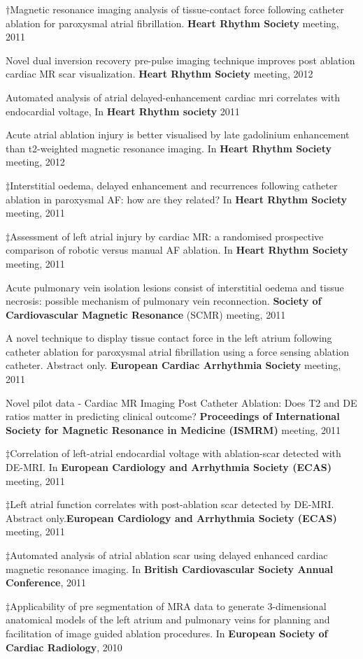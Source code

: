 \begin{etaremune}
\item $\dagger$Magnetic resonance imaging analysis of tissue-contact force following catheter ablation for paroxysmal atrial fibrillation. \textbf{Heart Rhythm Society} meeting, 2011 
\item Novel dual inversion recovery pre-pulse imaging technique improves post ablation cardiac MR scar visualization. \textbf{Heart Rhythm Society} meeting, 2012
\item Automated analysis of atrial delayed-enhancement cardiac mri correlates with endocardial voltage, In \textbf{Heart Rhythm society} 2011 
\item Acute atrial ablation injury is better visualised by late gadolinium enhancement than t2-weighted magnetic resonance imaging. In \textbf{Heart Rhythm Society} meeting, 2012
\item $\ddagger$Interstitial oedema, delayed enhancement and recurrences following catheter ablation in paroxysmal AF: how are they related? In \textbf{Heart Rhythm Society} meeting, 2011
\item $\ddagger$Assessment of left atrial injury by cardiac MR: a randomised prospective comparison of robotic versus manual AF ablation. In \textbf{Heart Rhythm Society} meeting, 2011
\item Acute pulmonary vein isolation lesions consist of interstitial oedema and tissue necrosis: possible mechanism of pulmonary vein reconnection. \textbf{Society of Cardiovascular Magnetic Resonance }(SCMR) meeting, 2011
\item A novel technique to display tissue contact force in the left atrium following catheter ablation for paroxysmal atrial fibrillation using a force sensing ablation catheter. Abstract only. \textbf{European Cardiac Arrhythmia Society} meeting, 2011
\item Novel pilot data - Cardiac MR Imaging Post Catheter Ablation: Does T2 and DE ratios matter in predicting clinical outcome? \textbf{Proceedings of International Society for Magnetic Resonance in Medicine (ISMRM)} meeting, 2011
\item $\ddagger$Correlation of left-atrial endocardial voltage with ablation-scar detected with DE-MRI. In \textbf{European Cardiology and Arrhythmia Society (ECAS)} meeting, 2011
\item $\ddagger$Left atrial function correlates with post-ablation scar detected by DE-MRI. Abstract only.\textbf{European Cardiology and Arrhythmia Society (ECAS)} meeting, 2011
\item $\ddagger$Automated analysis of atrial ablation scar using delayed enhanced cardiac magnetic resonance imaging. In \textbf{British Cardiovascular Society Annual Conference}, 2011
\item $\ddagger$Applicability of pre segmentation of MRA data to generate 3-dimensional anatomical models of the left atrium and pulmonary veins for planning and facilitation of image guided ablation procedures. In \textbf{European Society of Cardiac Radiology}, 2010 


\end{etaremune}
